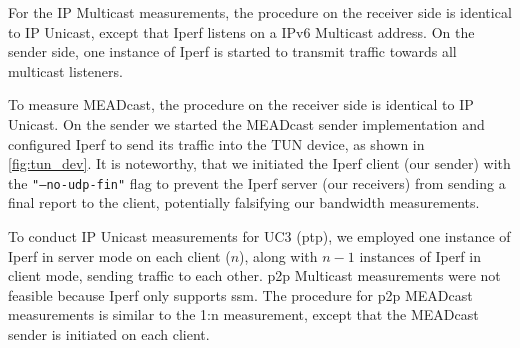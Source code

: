 For the IP Multicast measurements, the procedure on the receiver side is
    identical to IP Unicast, except that Iperf listens on a IPv6 Multicast
    address.
On the sender side, one instance of Iperf is started to transmit traffic
    towards all multicast listeners.

To measure MEADcast, the procedure on the receiver side is identical to IP
    Unicast.
On the sender we started the MEADcast sender implementation and configured
    Iperf to send its traffic into the TUN device, as shown in
    \autoref{fig:tun_dev}.
It is noteworthy, that we initiated the Iperf client (our sender) with the
    \texttt{"--no-udp-fin"} flag to prevent the Iperf server (our receivers)
    from sending a final report to the client, potentially falsifying our
    bandwidth measurements.

To conduct IP Unicast measurements for UC3 (\gls{ptp}), we employed one
    instance of Iperf in server mode on each client ($n$), along with $n-1$
    instances of Iperf in client mode, sending traffic to each other.
\gls{p2p} Multicast measurements were not feasible because Iperf only supports
    \gls{ssm}.
The procedure for \gls{p2p} MEADcast measurements is similar to the 1:n
    measurement, except that the MEADcast sender is initiated on each client.




